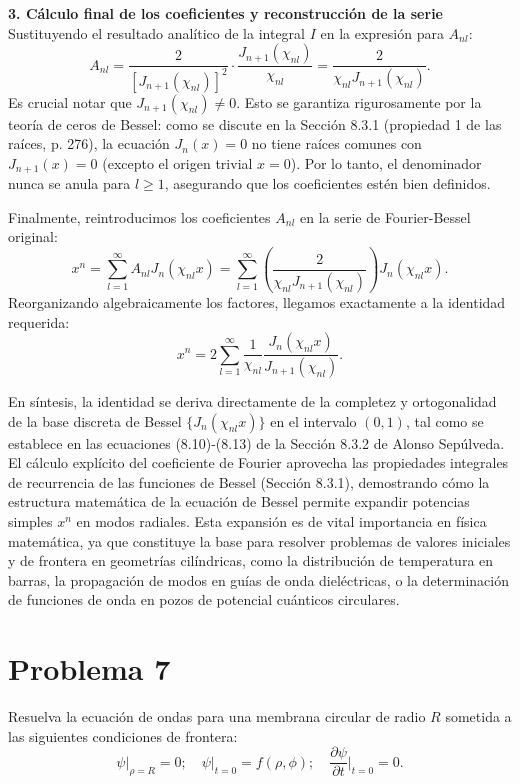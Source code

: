 \documentclass[a4paper]{article}
\begin{document}
\textbf{3. Cálculo final de los coeficientes y reconstrucción de la serie}
Sustituyendo el resultado analítico de la integral $I$ en la expresión para $A_{n l}$:
$$A_{n l} = \frac{2}{[J_{n+1}(\chi_{n l})]^2} \cdot \frac{J_{n+1}(\chi_{n l})}{\chi_{n l}} = \frac{2}{\chi_{n l} J_{n+1}(\chi_{n l})}.$$
Es crucial notar que $J_{n+1}(\chi_{n l}) \neq 0$. Esto se garantiza rigurosamente por la teoría de ceros de Bessel: como se discute en la Sección 8.3.1 (propiedad 1 de las raíces, p. 276), la ecuación $J_n(x)=0$ no tiene raíces comunes con $J_{n+1}(x)=0$ (excepto el origen trivial $x=0$). Por lo tanto, el denominador nunca se anula para $l \ge 1$, asegurando que los coeficientes estén bien definidos.

Finalmente, reintroducimos los coeficientes $A_{n l}$ en la serie de Fourier-Bessel original:
$$x^n = \sum_{l=1}^{\infty} A_{n l} J_n(\chi_{n l} x) = \sum_{l=1}^{\infty} \left( \frac{2}{\chi_{n l} J_{n+1}(\chi_{n l})} \right) J_n(\chi_{n l} x).$$
Reorganizando algebraicamente los factores, llegamos exactamente a la identidad requerida:
$$x^n = 2 \sum_{l=1}^{\infty} \frac{1}{\chi_{n l}} \frac{J_n(\chi_{n l} x)}{J_{n+1}(\chi_{n l})}.$$

En síntesis, la identidad se deriva directamente de la completez y ortogonalidad de la base discreta de Bessel $\{J_n(\chi_{nl}x)\}$ en el intervalo $(0,1)$, tal como se establece en las ecuaciones (8.10)-(8.13) de la Sección 8.3.2 de Alonso Sepúlveda. El cálculo explícito del coeficiente de Fourier aprovecha las propiedades integrales de recurrencia de las funciones de Bessel (Sección 8.3.1), demostrando cómo la estructura matemática de la ecuación de Bessel permite expandir potencias simples $x^n$ en modos radiales. Esta expansión es de vital importancia en física matemática, ya que constituye la base para resolver problemas de valores iniciales y de frontera en geometrías cilíndricas, como la distribución de temperatura en barras, la propagación de modos en guías de onda dieléctricas, o la determinación de funciones de onda en pozos de potencial cuánticos circulares.



\section{Problema 7}
Resuelva la ecuación de ondas para una membrana circular de radio $R$ sometida a las siguientes condiciones de frontera:
$$\psi \big|_{\rho=R} = 0; \quad \psi \big|_{t=0} = f(\rho, \phi); \quad \frac{\partial \psi}{\partial t} \bigg|_{t=0} = 0.$$
\end{document}
